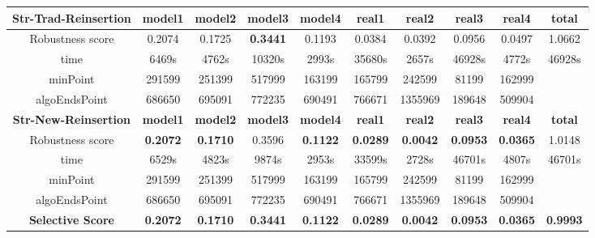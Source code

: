 \documentclass{article}
\begin{document}
\begin{table}[!htbp]
\begin{adjustwidth}{-2cm}{}
\begin{threeparttable}
\begin{tabular}{|c|c|c|c|c|c|c|c|c|c|}
				\textbf{Str-Trad-Reinsertion} & \textbf{model1} & \textbf{model2} & \textbf{model3} & \textbf{model4} & \textbf{real1} & \textbf{real2} & \textbf{real3} & \textbf{real4} & \textbf{total} \\ \hline
				Robustness score                 & 0.2074          & 0.1725          & \textbf{0.3441}          & 0.1193          & 0.0384         & 0.0392         & 0.0956         & 0.0497         & 1.0662         \\ \hline
				time                             & 6469s           & 4762s           & 10320s          & 2993s           & 35680s         & 2657s          & 46928s         & 4772s          & 46928s         \\ \hline
				minPoint                         & 291599          & 251399          & 517999          & 163199          & 165799         & 242599         & 81199          & 162999         &                \\ \hline
				algoEndsPoint                    & 686650          & 695091          & 772235          & 690491          & 766671         & 1355969        & 189648         & 509904         &                \\ \hline
				\textbf{Str-New-Reinsertion}         & \textbf{model1} & \textbf{model2} & \textbf{model3} & \textbf{model4} & \textbf{real1} & \textbf{real2} & \textbf{real3} & \textbf{real4} & \textbf{total} \\ \hline
				Robustness score                 & \textbf{0.2072}          & \textbf{0.1710}          & 0.3596          & \textbf{0.1122}          & \textbf{0.0289}         & \textbf{0.0042}         & \textbf{0.0953}         & \textbf{0.0365}         & 1.0148         \\ \hline
				time                             & 6529s           & 4823s           & 9874s           & 2953s           & 33599s         & 2728s          & 46701s         & 4807s          & 46701s         \\ \hline
				minPoint                         & 291599          & 251399          & 517999          & 163199          & 165799         & 242599         & 81199          & 162999         &                \\ \hline
				algoEndsPoint                    & 686650          & 695091          & 772235          & 690491          & 766671         & 1355969        & 189648         & 509904         &           \\ \hline \hline  
				\textbf{Selective Score}                 & \textbf{0.2072}          & \textbf{0.1710}          & \textbf{0.3441}          & \textbf{0.1122}          & \textbf{0.0289}         & \textbf{0.0042}         & \textbf{0.0953}         & \textbf{0.0365}         & \textbf{0.9993}   \\ \hline 				


\end{tabular}
\end{threeparttable}
\end{adjustwidth}
\end{table}
\end{document}
